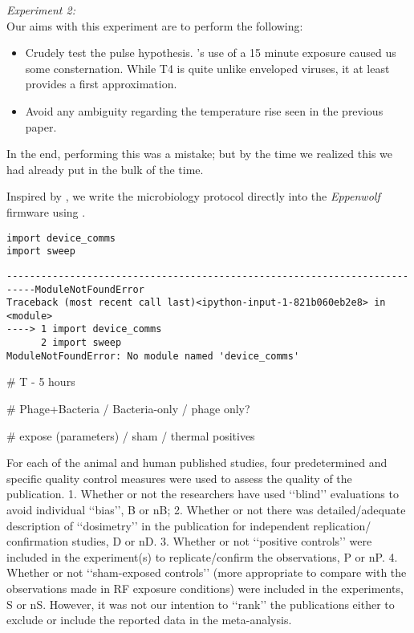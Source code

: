 \documentclass[paper.tex]{subfiles}
\begin{document}
\clearpage
{\Large \it Experiment 2:}\\


Our aims with this experiment are to perform the following:

\begin{itemize}
\item Crudely test the pulse hypothesis. \cite{Efficient2015}'s use of a 15 minute exposure caused us some consternation.
    While T4 is quite unlike enveloped viruses, it at least provides a first approximation.
\item Avoid any ambiguity regarding the temperature rise seen in the previous paper.
\end{itemize}

In the end, performing this was a mistake; but by the time we realized this we had already put in the bulk of the time.



Inspired by \cite{Biocoder2010}, we write the microbiology protocol directly into the {\it Eppenwolf} firmware using \cite{Noweb}.




\begin{verbatim}
import device_comms
import sweep
\end{verbatim}
\begin{verbatim}
---------------------------------------------------------------------------ModuleNotFoundError
Traceback (most recent call last)<ipython-input-1-821b060eb2e8> in
<module>
----> 1 import device_comms
      2 import sweep
ModuleNotFoundError: No module named 'device_comms'
\end{verbatim}



# T - 5 hours


# Phage+Bacteria / Bacteria-only / phage only?

# expose (parameters) / sham / thermal positives

For each of the animal and human published studies, four
predetermined and specific quality control measures were used to
assess the quality of the publication.
1. Whether or not the researchers have used ‘‘blind’’ evaluations to
avoid individual ‘‘bias’’, B or nB;
2. Whether or not there was detailed/adequate description of
‘‘dosimetry’’ in the publication for independent replication/
confirmation studies, D or nD.
3. Whether or not ‘‘positive controls’’ were included in the
experiment(s) to replicate/confirm the observations, P or nP.
4. Whether or not ‘‘sham-exposed controls’’ (more appropriate to
compare with the observations made in RF exposure conditions)
were included in the experiments, S or nS. However, it was not our
intention to ‘‘rank’’ the publications either to exclude or include
the reported data in the meta-analysis.
\end{document}
